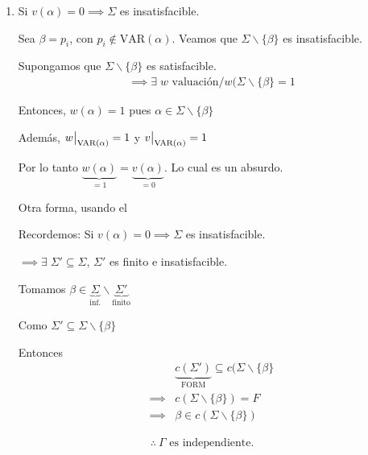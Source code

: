 \begin{itemize}
\begin{enumerate}
\begin{enumerate}
                    \item Si $v(\alpha) = 0 \implies \Sigma$ es 
                        insatisfacible.

                        Sea $\beta = p_i$, con $p_i \notin \mathrm{VAR}(\alpha)$.
                        Veamos que $\Sigma \backslash \{ \beta \}$ es
                        insatisfacible.

                        Supongamos que $\Sigma \backslash \{ \beta \}$ es
                        satisfacible.
                        \begin{gather*}
                            \implies \exists \; w \text{ valuación} /
                            w(\Sigma \backslash \{\beta\} = 1
                        \end{gather*}

                        Entonces, $w(\alpha) = 1$ pues
                        $\alpha \in \Sigma \backslash \{ \beta \}$

                        Además, $\frest{w}{\mathrm{VAR}(\alpha)} = 1$ y
                        $\frest{v}{\mathrm{VAR}(\alpha)} = 1$

                        Por lo tanto $\underbrace{w(\alpha)}_{=1} 
                            = \underbrace{v(\alpha)}_{= 0}$.
                        Lo cual es un absurdo.

                        \bigskip
                        Otra forma, usando el 

                        Recordemos: Si $v(\alpha) = 0 \implies \Sigma$ es 
                        insatisfacible.

                        $\implies \exists \; \Sigma' \subseteq \Sigma$, 
                        $\Sigma'$ es finito e insatisfacible.

                        Tomamos $\beta \in \underbrace{\Sigma}_{\text{inf.}} 
                        \backslash \underbrace{\Sigma'}_{\text{finito}}$

                        Como $\Sigma' \subseteq \Sigma \backslash \{\beta\}$

                        Entonces
                        \begin{align*}
                            & \underbrace{c(\Sigma')}_{\mathrm{FORM}} 
                            \subseteq c(\Sigma \backslash \{\beta\} \\
                            \implies & c(\Sigma \backslash \{ \beta \}) = F \\
                            \implies & \beta \in 
                            c(\Sigma\backslash \{ \beta \})
                        \end{align*}
                \end{enumerate}

                \begin{gather*}
                    \therefore ~ \Gamma \text{ es independiente.}
                \end{gather*}
        \end{enumerate}
\end{itemize}

